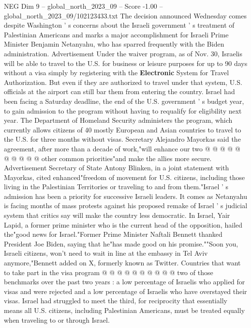 \begin{textsample}{NEG Dim 9 – global\_north\_2023\_09 – Score -1.00 – global\_north\_2023\_09/102123433.txt}  \label{ex:f9_neg_040}
The decision announced Wednesday comes despite Washington ' s concerns about the Israeli government ' s treatment of Palestinian Americans and marks a major accomplishment for Israeli Prime Minister Benjamin Netanyahu, who has sparred frequently with the Biden administration.
Advertisement Under the waiver program, as of Nov. 30, Israelis will be able to travel to the U.S. for business or leisure purposes for up to 90 days without a visa simply by registering with the \textbf{Electronic} System for Travel Authorization.
But even if they are authorized to travel under that system, U.S. officials at the airport can still bar them from entering the country.
Israel had been facing a Saturday deadline, the end of the U.S. government ' s budget year, to gain admission to the program without having to requalify for eligibility next year.
The Department of Homeland Security administers the program, which currently allows citizens of 40 mostly European and Asian countries to travel to the U.S. for three months without visas.
Secretary Alejandro Mayorkas said the agreement, after more than a decade of work,"will enhance our two @ @ @ @ @ @ @ @ @ @ other common priorities"and make the allies more secure.
Advertisement Secretary of State Antony Blinken, in a joint statement with Mayorkas, cited enhanced"freedom of movement for U.S. citizens, including those living in the Palestinian Territories or traveling to and from them."Israel ' s admission has been a priority for successive Israeli leaders.
It comes as Netanyahu is facing months of mass protests against his proposed remake of Israel ' s judicial system that critics say will make the country less democratic.
In Israel, Yair Lapid, a former prime minister who is the current head of the opposition, hailed the"good news for Israel."Former Prime Minister Naftali Bennett thanked President Joe Biden, saying that he"has made good on his promise.""Soon you, Israeli citizens, won't need to wait in line at the embassy in Tel Aviv anymore,"Bennett added on X, formerly known as Twitter.
Countries that want to take part in the visa program @ @ @ @ @ @ @ @ @ @ two of those benchmarks over the past two years : a low percentage of Israelis who applied for visas and were rejected and a low percentage of Israelis who have overstayed their visas.
Israel had struggled to meet the third, for reciprocity that essentially means all U.S. citizens, including Palestinian Americans, must be treated equally when traveling to or through Israel.

\end{textsample}
